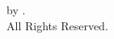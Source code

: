 \clearpage
\null\vspace{20em}
\begin{centering}
	{\Large \textcopyright \xspace \year \xspace by \student.} \\
	{\Large All Rights Reserved.} \\
\end{centering}
